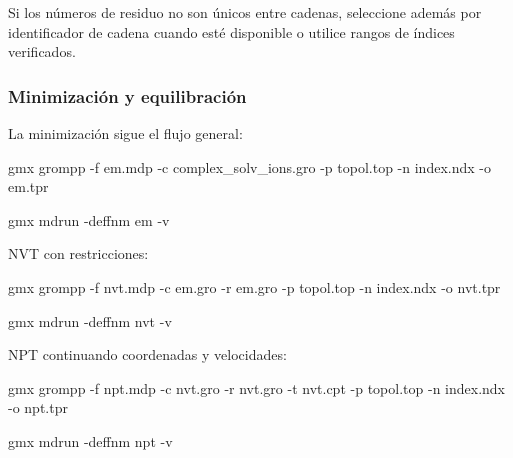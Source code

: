 \documentclass[
  spanish,
  11pt,
  a4paper]{article}
\newenvironment{Shaded}{\begin{snugshade}}{\end{snugshade}}
\newcommand{\AttributeTok}[1]{\textcolor[rgb]{0.13,0.29,0.53}{#1}}
\newcommand{\ExtensionTok}[1]{#1}
\newcommand{\NormalTok}[1]{#1}
\begin{document}
Si los números de residuo no son únicos entre cadenas, seleccione además
por identificador de cadena cuando esté disponible o utilice rangos de
índices verificados.

\subsubsection{Minimización y
equilibración}\label{minimizaciuxf3n-y-equilibraciuxf3n}

La minimización sigue el flujo general:

\begin{Shaded}
\begin{Highlighting}[]
\ExtensionTok{gmx}\NormalTok{ grompp     }\AttributeTok{{-}f}\NormalTok{ em.mdp     }\AttributeTok{{-}c}\NormalTok{ complex\_solv\_ions.gro     }\AttributeTok{{-}p}\NormalTok{ topol.top     }\AttributeTok{{-}n}\NormalTok{ index.ndx     }\AttributeTok{{-}o}\NormalTok{ em.tpr}

\ExtensionTok{gmx}\NormalTok{ mdrun }\AttributeTok{{-}deffnm}\NormalTok{ em }\AttributeTok{{-}v}
\end{Highlighting}
\end{Shaded}

NVT con restricciones:

\begin{Shaded}
\begin{Highlighting}[]
\ExtensionTok{gmx}\NormalTok{ grompp     }\AttributeTok{{-}f}\NormalTok{ nvt.mdp     }\AttributeTok{{-}c}\NormalTok{ em.gro     }\AttributeTok{{-}r}\NormalTok{ em.gro     }\AttributeTok{{-}p}\NormalTok{ topol.top     }\AttributeTok{{-}n}\NormalTok{ index.ndx     }\AttributeTok{{-}o}\NormalTok{ nvt.tpr}

\ExtensionTok{gmx}\NormalTok{ mdrun }\AttributeTok{{-}deffnm}\NormalTok{ nvt }\AttributeTok{{-}v}
\end{Highlighting}
\end{Shaded}

NPT continuando coordenadas y velocidades:

\begin{Shaded}
\begin{Highlighting}[]
\ExtensionTok{gmx}\NormalTok{ grompp     }\AttributeTok{{-}f}\NormalTok{ npt.mdp     }\AttributeTok{{-}c}\NormalTok{ nvt.gro     }\AttributeTok{{-}r}\NormalTok{ nvt.gro     }\AttributeTok{{-}t}\NormalTok{ nvt.cpt     }\AttributeTok{{-}p}\NormalTok{ topol.top     }\AttributeTok{{-}n}\NormalTok{ index.ndx     }\AttributeTok{{-}o}\NormalTok{ npt.tpr}

\ExtensionTok{gmx}\NormalTok{ mdrun }\AttributeTok{{-}deffnm}\NormalTok{ npt }\AttributeTok{{-}v}
\end{Highlighting}
\end{Shaded}
\end{document}
